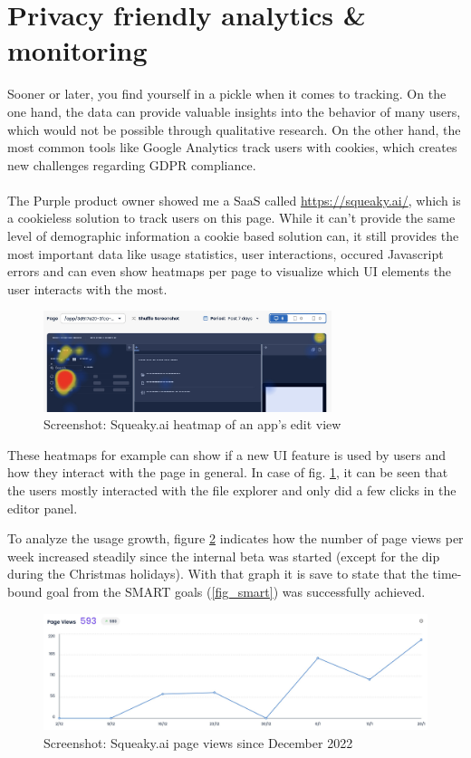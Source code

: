 \section{Privacy friendly analytics \& monitoring}

Sooner or later, you find yourself in a pickle when it comes to tracking.
On the one hand, the data can provide valuable insights into the behavior of many users, which would not be possible through qualitative research.
On the other hand, the most common tools like Google Analytics track users with cookies, which creates new challenges regarding GDPR compliance.
\\\\
The Purple product owner showed me a SaaS called \url{https://squeaky.ai/}, which is a cookieless solution to track users on this page.
While it can't provide the same level of demographic information a cookie based solution can, it still provides the most important data like usage statistics,
user interactions, occured Javascript errors and can even show heatmaps per page to visualize which UI elements the user interacts with the most.

\begin{figure}[h]
  \centering
  \includegraphics[width=0.75\textwidth]{pics/squeaky_heatmap.jpg}
  \caption{Screenshot: Squeaky.ai heatmap of an app's edit view}
  \label{fig:squeaky}
\end{figure}

These heatmaps for example can show if a new UI feature is used by users and how they interact with the page in general.
In case of fig. \ref{fig:squeaky}, it can be seen that the users mostly interacted with the file explorer and only did a few clicks in the editor panel.

To analyze the usage growth, figure \ref{fig:squeaky_users} indicates how the number of page views per week increased steadily since the internal beta was started (except for the dip during the Christmas holidays).
With that graph it is save to state that the time-bound goal from the SMART goals (\ref{fig_smart}) was successfully achieved.
\begin{figure}[h]
  \centering
  \includegraphics[width=\textwidth]{pics/squeaky_user_curve.jpg}
  \caption{Screenshot: Squeaky.ai page views since December 2022}
  \label{fig:squeaky_users}
\end{figure}


